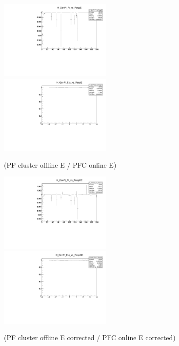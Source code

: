 \begin{figure}
\includegraphics[width=0.495\textwidth]{./plots_pdf/ECAL_plots/Prod6/PU/H_GenPi_Pt_vs_RespE.pdf}
\includegraphics[width=0.495\textwidth]{./plots_pdf/ECAL_plots/Prod6/PU/H_GenPi_Eta_vs_RespE.pdf}
\caption{(PF cluster offline E / PFC online E)}
\label{fig:PU_ECAL_Offline_vs_Online_E}
\end{figure}

\begin{figure}
\includegraphics[width=0.495\textwidth]{./plots_pdf/ECAL_plots/Prod6/PU/H_GenPi_Pt_vs_RespCE.pdf}
\includegraphics[width=0.495\textwidth]{./plots_pdf/ECAL_plots/Prod6/PU/H_GenPi_Eta_vs_RespCE.pdf}
\caption{(PF cluster offline E corrected / PFC online E corrected)}
\label{fig:PU_ECAL_Offline_vs_Online_CE}
\end{figure}       
